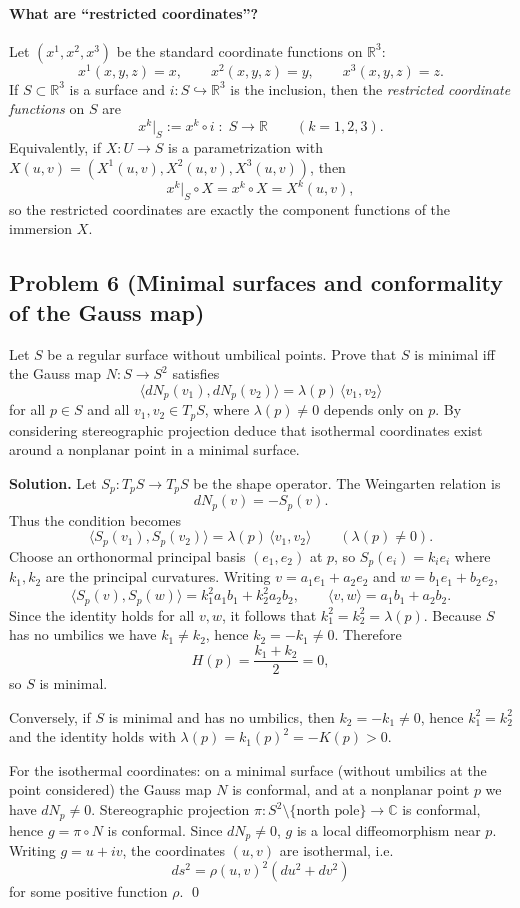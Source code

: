 \documentclass[12pt,a4paper]{article}
\theoremstyle{plain}
\theoremstyle{definition}      %
\begin{document}
\paragraph{What are ``restricted coordinates''?}
Let $(x^1,x^2,x^3)$ be the standard coordinate functions on $\mathbb{R}^3$:
\[
x^1(x,y,z)=x,\qquad x^2(x,y,z)=y,\qquad x^3(x,y,z)=z.
\]
If $S\subset\mathbb{R}^3$ is a surface and $i:S\hookrightarrow \mathbb{R}^3$ is the inclusion,
then the \emph{restricted coordinate functions} on $S$ are
\[
x^k|_S := x^k\circ i \;:\; S\to\mathbb{R}\qquad (k=1,2,3).
\]
Equivalently, if $X:U\to S$ is a parametrization with
$X(u,v)=(X^1(u,v),X^2(u,v),X^3(u,v))$, then
\[
x^k|_S \circ X = x^k\circ X = X^k(u,v),
\]
so the restricted coordinates are exactly the component functions of the immersion $X$.
	
	
\subsection*{Problem 6 (Minimal surfaces and conformality of the Gauss map)}
	Let $S$ be a regular surface without umbilical points. Prove that $S$ is minimal iff the Gauss map
	$N:S\to S^2$ satisfies
	\[
	\langle dN_p(v_1), dN_p(v_2)\rangle = \lambda(p)\,\langle v_1,v_2\rangle
	\]
	for all $p\in S$ and all $v_1,v_2\in T_pS$, where $\lambda(p)\neq 0$ depends only on $p$.
	By considering stereographic projection deduce that isothermal coordinates exist around a nonplanar point
	in a minimal surface.
	
	\medskip
	\textbf{Solution.}
	Let $S_p:T_pS\to T_pS$ be the shape operator. The Weingarten relation is
	\[
	dN_p(v)=-S_p(v).
	\]
	Thus the condition becomes
	\[
	\langle S_p(v_1), S_p(v_2)\rangle = \lambda(p)\,\langle v_1,v_2\rangle
	\qquad(\lambda(p)\neq 0).
	\]
	Choose an orthonormal principal basis $(e_1,e_2)$ at $p$, so $S_p(e_i)=k_i e_i$ where $k_1,k_2$ are the
	principal curvatures. Writing $v=a_1e_1+a_2e_2$ and $w=b_1e_1+b_2e_2$,
	\[
	\langle S_p(v),S_p(w)\rangle = k_1^2 a_1b_1 + k_2^2 a_2b_2,\qquad
	\langle v,w\rangle = a_1b_1+a_2b_2.
	\]
	Since the identity holds for all $v,w$, it follows that $k_1^2=k_2^2=\lambda(p)$.
	Because $S$ has no umbilics we have $k_1\neq k_2$, hence $k_2=-k_1\neq 0$.
	Therefore
	\[
	H(p)=\frac{k_1+k_2}{2}=0,
	\]
	so $S$ is minimal.
	
	Conversely, if $S$ is minimal and has no umbilics, then $k_2=-k_1\neq 0$, hence $k_1^2=k_2^2$ and the
	identity holds with $\lambda(p)=k_1(p)^2=-K(p)>0$.
	
	\medskip
	For the isothermal coordinates: on a minimal surface (without umbilics at the point considered) the Gauss map
	$N$ is conformal, and at a nonplanar point $p$ we have $dN_p\neq 0$.
	Stereographic projection $\pi:S^2\setminus\{\text{north pole}\}\to\mathbb C$ is conformal, hence
	$g=\pi\circ N$ is conformal. Since $dN_p\neq 0$, $g$ is a local diffeomorphism near $p$.
	Writing $g=u+iv$, the coordinates $(u,v)$ are isothermal, i.e.
	\[
	ds^2 = \rho(u,v)^2(du^2+dv^2)
	\]
	for some positive function $\rho$.
	\qed
	
\end{document}
